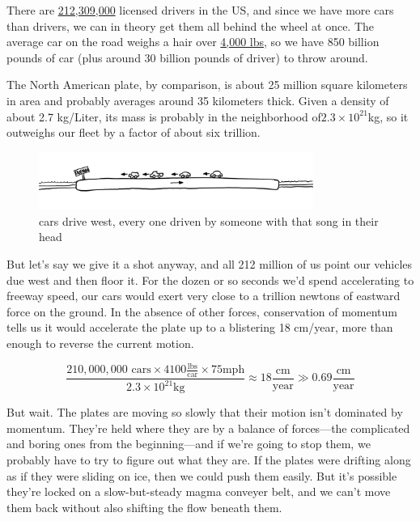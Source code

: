 {There are \href{http://nhts.ornl.gov/tables09/FatCat.aspx}{212,309,000} licensed drivers in the US, and since we have more cars than drivers, we can in theory get them all behind the wheel at once. The average car on the road weighs a hair over \href{http://www.nytimes.com/2004/05/05/business/05weight.html} {4,000 lbs}, so we have 850 billion pounds of car (plus around 30 billion pounds of driver) to throw around.}

{The North American plate, by comparison, is about 25 million square kilometers in area and probably averages around 35 kilometers thick. Given a density of about 2.7 kg/Liter, its mass is probably in the neighborhood of\(2.3\times 10^{21}\)kg, so it outweighs our fleet by a factor of about six trillion.}

\begin{figure}[!htbp]
\centering
\includegraphics[scale=0.5, max width=0.8\textwidth]{imgs/a/41/go_west_setup.png}
\caption{cars drive west, every one driven by someone with that song in their head}
\end{figure}

{But let's say we give it a shot anyway, and all 212 million of us point our vehicles due west and then floor it. For the dozen or so seconds we’d spend accelerating to freeway speed, our cars would exert very close to a trillion newtons of eastward force on the ground. In the absence of other forces, conservation of momentum tells us it would accelerate the plate up to a blistering 18 cm/year, more than enough to reverse the current motion.}

{\[\frac{210,000,000\text{ cars}\times 4100\frac{\text{lbs}}{\text{car}}\times 75\text{mph}}{2.3\times 10^{21}\text{kg}}\approx 18\frac{\text{cm}}{\text{year}}\gg 0.69\frac{\text{cm}}{\text{year}}\]}

{But wait. The plates are moving so slowly that their motion isn’t dominated by momentum. They’re held where they are by a balance of forces—the complicated and boring ones from the beginning—and if we’re going to stop them, we probably have to try to figure out what they are. If the plates were drifting along as if they were sliding on ice, then we could push them easily. But it’s possible they’re locked on a slow-but-steady magma conveyer belt, and we can’t move them back without also shifting the flow beneath them.}

